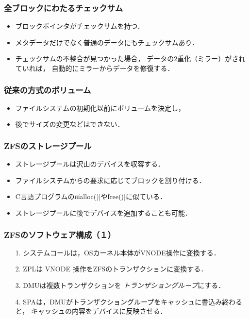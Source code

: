 \documentclass[unicode,handout]{beamer}                   %
\begin{document}
\begin{frame}
  \frametitle{全ブロックにわたるチェックサム}
  \vfill
  \begin{itemize}
    \item ブロックポインタがチェックサムを持つ．
    \item メタデータだけでなく普通のデータにもチェックサムあり．
    \item チェックサムの不整合が見つかった場合，
      データの2重化（ミラー）がされていれば，
      自動的にミラーからデータを修復する．
  \end{itemize}
  \vfill
\end{frame}

\begin{frame}[fragile]
  \frametitle{従来の方式のボリューム}
  \vfill
  \begin{itemize}
  \item ファイルシステムの初期化以前にボリュームを決定し，
  \item 後でサイズの変更などはできない．
  \end{itemize}
  \vfill
\end{frame}
  
\begin{frame}[fragile]
  \frametitle{ZFSのストレージプール}
  \vfill
  \begin{itemize}
  \item ストレージプールは沢山のデバイスを収容する．
  \item ファイルシステムからの要求に応じてブロックを割り付ける．
  \item C言語プログラムの\|malloc()|や\|free()|に似ている．
  \item ストレージプールに後でデバイスを追加することも可能．
  \end{itemize}
  \vfill
\end{frame}
  
\begin{frame}[fragile]
  \frametitle{ZFSのソフトウェア構成（１）}
  \vfill
  \begin{enumerate}
  \item[1.] システムコールは，OSカーネル本体がVNODE操作に変換する．
  \item[2.] ZPLは VNODE 操作をZFSのトランザクションに変換する．
  \item[3.] DMUは複数トランザクションを
    \emph{トランザショングループ}にする．
  \item[4.] SPAは，DMUがトランザクショングループをキャッシュに書込み終わると，
    キャッシュの内容をデバイスに反映させる．
  \end{enumerate}  
  \vfill
\end{frame}
\end{document}
